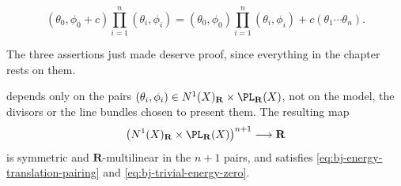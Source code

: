 \[
 (\theta_0,\phi_0+c)\prod_{i=1}^n(\theta_i,\phi_i)
 = (\theta_0,\phi_0)\prod_{i=1}^n(\theta_i,\phi_i)
    +c(\theta_1\cdots\theta_n).
\tag{46.6}\label{eq:bj-energy-translation-pairing}
\]

The three assertions just made deserve proof, since everything in the
chapter rests on them.

\begin{proposition}
\label{prop:ch46-pairing-wellposed}
 depends only on the pairs
$(\theta_i,\phi_i)\in N^1(X)_{\mathbf R}\times\PL_{\mathbf R}(X)$, not on
the model, the divisors or the line bundles chosen to present them.  The
resulting map
\[
 \bigl(N^1(X)_{\mathbf R}\times\PL_{\mathbf R}(X)\bigr)^{n+1}
 \longrightarrow\mathbf R
\]
is symmetric and $\mathbf R$-multilinear in the $n+1$ pairs, and
satisfies \eqref{eq:bj-energy-translation-pairing} and
\eqref{eq:bj-trivial-energy-zero}.
\end{proposition}

